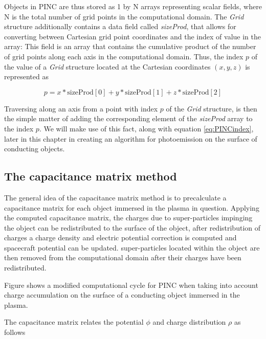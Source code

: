 Objects in PINC are thus stored as 1 by N arrays representing scalar fields, where N is the total number of grid points in the computational domain. The \textit{Grid} structure additionally contains a data field called \textit{sizeProd}, that allows for converting between Cartesian grid point coordinates and the index of value in the array: This field is an array that contains the cumulative product of the number of grid points along each axis in the computational domain. Thus, the index $p$ of the value of a \textit{Grid} structure located at the Cartesian coordinates $(x,y,z)$ is represented as

\begin{equation}\label{eq:PINCindex}
    p = x * \text{sizeProd}[0] + y * \text{sizeProd}[1] + z * \text{sizeProd}[2]
\end{equation}

Traversing along an axis from a point with index $p$ of the \textit{Grid} structure, is then the simple matter of adding the corresponding element of the \textit{sizeProd} array to the index $p$. We will make use of this fact, along with equation \ref{eq:PINCindex}, later in this chapter in creating an algorithm for photoemission on the surface of conducting objects. 


\subsection{The capacitance matrix method}
The general idea of the capacitance matrix method is to precalculate a capacitance matrix for each object immersed in the plasma in question. Applying the computed capacitance matrix, the charges due to super-particles impinging the object can be redistributed to the surface of the object, after redistribution of charges a charge density and electric potential correction is computed and spacecraft potential can be updated. super-particles located within the object are then removed from the computational domain after their charges have been redistributed. 

Figure  shows a modified computational cycle for PINC when taking into account charge accumulation on the surface of a conducting object immersed in the plasma.

The capacitance matrix relates the potential $\phi$ and charge distribution $\rho$ as follows 

